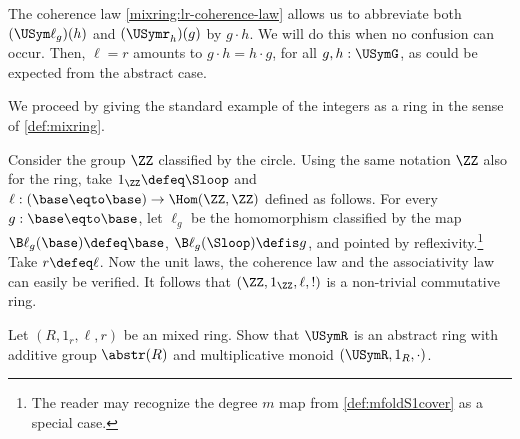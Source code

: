 The coherence law \ref{mixring:lr-coherence-law} allows us to abbreviate both 
$(\USym\ell_g)(h)$ and $(\USymr_h)(g)$ by $g\cdot h$. We will do this when
no confusion can occur. Then, $\ell=r$ 
amounts to $g\cdot h = h\cdot g$, for all $g,h : \USymG$,
as could be expected from the abstract case.

We proceed by giving the standard example of the integers as a ring
in the sense of \cref{def:mixring}.
\begin{example}
Consider the group $\ZZ$ classified by the circle.
Using the same notation $\ZZ$ also for the ring, take $1_\ZZ \defeq\Sloop$
and $\ell: (\base\eqto\base)\to\Hom(\ZZ,\ZZ)$ defined as follows.
For every $g:\base\eqto\base$, let $\ell_g$ be the homomorphism
classified by the map $\B\ell_g(\base)\defeq\base$, 
$\B\ell_g(\Sloop)\defis g$, and pointed by reflexivity.\footnote{%
The reader may recognize the degree $m$
map from \cref{def:mfoldS1cover} as a special case.}
Take $r\defeq\ell$. Now the unit laws, the coherence law and
the associativity law can easily be verified. It follows that
$(\ZZ,1_\ZZ,\ell,!)$ is a non-trivial commutative ring.
\end{example}


\begin{xca}\label{xca:Rmixring->URabstring}
Let $(R,1_r,\ell,r)$ be an mixed ring. 
Show that $\USymR$ is an abstract ring with
additive group $\abstr(R)$ and multiplicative 
monoid $(\USymR,1_R,\cdot)$. 
\end{xca}

